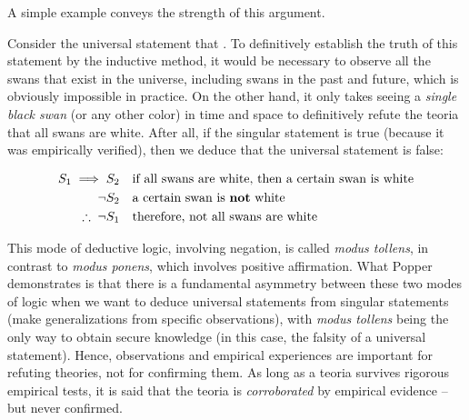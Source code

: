 \documentclass[./main_en.tex]{subfiles}
\begin{document}
\par A simple example conveys the strength of this argument.

\par Consider the universal statement that . To definitively establish the truth of this statement by the inductive method, it would be necessary to observe all the swans that exist in the universe, including swans in the past and future, which is obviously impossible in practice. On the other hand, it only takes seeing a \textit{single black swan} (or any other color) in time and space to definitively refute the \gls{teoria} that all swans are white. After all, if the singular statement  is true (because it was empirically verified), then we deduce that the universal statement  is false:
\begin{linenomath*}
    \begin{align*}
        S_1 \implies S_2 & \quad \textnormal{if all swans are white, then a certain swan is white} \\
        \neg S_2 & \quad \textnormal{a certain swan is \textbf{not} white}\\
        \therefore\;\neg S_1 & \quad \textnormal{therefore, not all swans are white}
    \end{align*}
\end{linenomath*}
This mode of deductive logic, involving negation, is called \textit{modus tollens}, in contrast to \textit{modus ponens}, which involves positive affirmation. What Popper demonstrates is that there is a fundamental asymmetry between these two modes of logic when we want to deduce universal statements from singular statements (make generalizations from specific observations), with \textit{modus tollens} being the only way to obtain secure knowledge (in this case, the falsity of a universal statement). Hence, observations and empirical experiences are important for refuting theories, not for confirming them. As long as a \gls{teoria} survives rigorous empirical tests, it is said that the \gls{teoria} is \textit{corroborated} by empirical evidence – but never confirmed.
\end{document}
